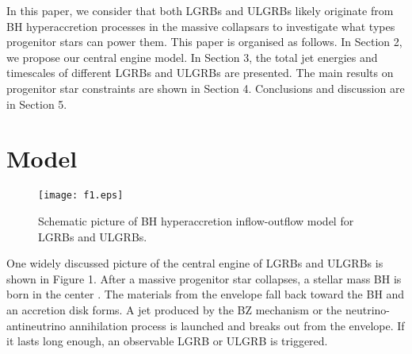 \documentclass[twocolumn]{aastex6}
\begin{document}
In this paper, we consider that both LGRBs and ULGRBs likely originate from BH hyperaccretion processes in the massive collapsars to investigate what types progenitor stars can power them. This paper is organised as follows. In Section 2, we propose our central engine model. In Section 3, the total jet energies and timescales of different LGRBs and ULGRBs are presented. The main results on progenitor star constraints are shown in Section 4. Conclusions and discussion are in Section 5.

\section{Model}

\begin{figure}
\texttt{[image: f1.eps]}
\caption{Schematic picture of BH hyperaccretion inflow-outflow model for LGRBs and ULGRBs.}
\label{fig1}
\end{figure}

One widely discussed picture of the central engine of LGRBs and ULGRBs is shown in Figure 1. After a massive progenitor star collapses, a stellar mass BH is born in the center \citep[e.g.,][]{Heger2003}. The materials from the envelope fall back toward the BH and an accretion disk forms. A jet produced by the BZ mechanism \citep{Blandford1977} or the neutrino-antineutrino annihilation process is launched and breaks out from the envelope. If it lasts long enough, an observable LGRB or ULGRB is triggered.
\end{document}
